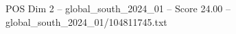 \begin{textsample}{POS Dim 2 – global\_south\_2024\_01 – Score 24.00 – global\_south\_2024\_01/104811745.txt}
\end{textsample}
